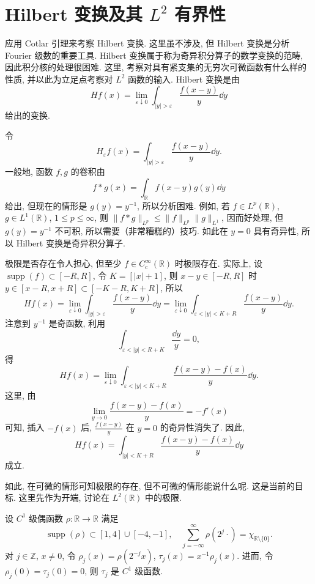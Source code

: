 
\section{\texorpdfstring{Hilbert 变换及其 $L^{2}$ 有界性}{Hilbert 变换及其 L2 有界性}}\label{sec:4.2}

应用 Cotlar 引理来考察 Hilbert 变换. 这里虽不涉及, 但 Hilbert 变换是分析 Fourier 级数的重要工具. Hilbert 变换属于称为奇异积分算子的数学变换的范畴, 因此积分核的处理很困难. 这里, 考察对具有紧支集的无穷次可微函数有什么样的性质, 并以此为立足点考察对 $L^{2}$ 函数的输入. Hilbert 变换是由
\[
Hf(x) = \lim_{\varepsilon \downarrow 0}\int_{|y| > \varepsilon}\frac{f(x-y)}{y}\dd y
\]
给出的变换.

令
\[
H_{\varepsilon}f(x) = \int_{|y| > \varepsilon}\frac{f(x-y)}{y}\dd y.
\]
一般地, 函数 $f, g$ 的卷积由
\[
f * g(x) = \int_{\mathbb{R}}f(x-y)g(y)\dd y
\]
给出, 但现在的情形是 $g(y) = y^{-1}$, 所以分析困难. 例如, 若 $f \in L^{p}(\mathbb{R})$, $g \in L^{1}(\mathbb{R})$, $1 \leq p \leq \infty$, 则 $\|f * g\|_{L^{p}} \leq \|f\|_{L^{p}}\|g\|_{L^{1}}$, 因而好处理, 但 $g(y) = y^{-1}$ 不可积, 所以需要（非常糟糕的）技巧. 如此在 $y = 0$ 具有奇异性, 所以 Hilbert 变换是奇异积分算子.

极限是否存在令人担心, 但至少 $f \in C_{\mathrm{c}}^{\infty}(\mathbb{R})$ 时极限存在. 实际上, 设 $\operatorname{supp}(f) \subset [-R, R]$, 令 $K = [|x|+1]$, 则 $x - y \in [-R, R]$ 时 $y \in [x-R, x+R] \subset [-K-R, K+R]$, 所以
\[
Hf(x) = \lim_{\varepsilon \downarrow 0}\int_{|y| > \varepsilon}\frac{f(x-y)}{y}\dd y = \lim_{\varepsilon \downarrow 0}\int_{\varepsilon < |y| < K+R}\frac{f(x-y)}{y}\dd y.
\]
注意到 $y^{-1}$ 是奇函数, 利用
\[
\int_{\varepsilon < |y| < R+K}\frac{\dd y}{y} = 0,
\]
得
\[
Hf(x) = \lim_{\varepsilon \downarrow 0}\int_{\varepsilon < |y| < K+R}\frac{f(x-y)-f(x)}{y}\dd y.
\]
这里, 由
\[
\lim_{y \to 0}\frac{f(x-y)-f(x)}{y} = -f'(x)
\]
可知, 插入 $-f(x)$ 后, $\frac{f(x-y)}{y}$ 在 $y = 0$ 的奇异性消失了. 因此,
\begin{equation}\tag{4.7}
Hf(x) = \int_{|y| < K+R}\frac{f(x-y)-f(x)}{y}\dd y
\label{eq:4.7}
\end{equation}
成立.

如此, 在可微的情形可知极限的存在, 但不可微的情形能说什么呢. 这是当前的目标. 这里先作为开端, 讨论在 $L^{2}(\mathbb{R})$ 中的极限.

设 $C^{1}$ 级偶函数 $\rho: \mathbb{R} \to \mathbb{R}$ 满足
\[
\operatorname{supp}(\rho) \subset [1, 4] \cup [-4, -1], \quad \sum_{j=-\infty}^{\infty}\rho(2^{j}\cdot) = \chi_{\mathbb{R}\setminus\{0\}}.
\]
对 $j \in \mathbb{Z}$, $x \neq 0$, 令 $\rho_{j}(x) = \rho(2^{-j}x)$, $\tau_{j}(x) = x^{-1}\rho_{j}(x)$. 进而, 令 $\rho_{j}(0) = \tau_{j}(0) = 0$, 则 $\tau_{j}$ 是 $C^{1}$ 级函数.

